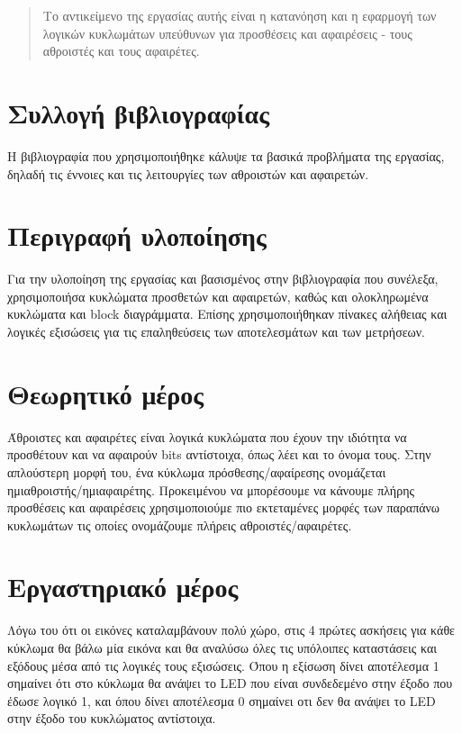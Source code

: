 \documentclass{article}
\begin{document}
\begin{titlepage}
\maketitle
\end{titlepage}

\renewcommand{\contentsname}{Περιεχόμενα}
\tableofcontents

\renewcommand{\abstractname}{Εισαγωγή}
\begin{abstract}
	Το αντικείμενο της εργασίας αυτής είναι η κατανόηση και η εφαρμογή
	των λογικών κυκλωμάτων υπεύθυνων για προσθέσεις και αφαιρέσεις - τους
	αθροιστές και τους αφαιρέτες.
\end{abstract}
\pagebreak

\section{Συλλογή βιβλιογραφίας}
Η βιβλιογραφία που χρησιμοποιήθηκε κάλυψε τα βασικά προβλήματα της εργασίας,
δηλαδή τις έννοιες και τις λειτουργίες των αθροιστών και αφαιρετών.

\section{Περιγραφή υλοποίησης}
Για την υλοποίηση της εργασίας και βασισμένος στην βιβλιογραφία που συνέλεξα,
χρησιμοποιήσα κυκλώματα προσθετών και αφαιρετών, καθώς και ολοκληρωμένα κυκλώματα και
block διαγράμματα.
Επίσης χρησιμοποιήθηκαν πίνακες αλήθειας και λογικές εξισώσεις για τις επαληθεύσεις
των αποτελεσμάτων και των μετρήσεων.

\section{Θεωρητικό μέρος}
Άθροιστες και αφαιρέτες είναι λογικά κυκλώματα που έχουν την ιδιότητα να προσθέτουν
και να αφαιρούν bits αντίστοιχα, όπως λέει και το όνομα τους. Στην απλούστερη μορφή του,
ένα κύκλωμα πρόσθεσης/αφαίρεσης ονομάζεται ημιαθροιστής/ημιαφαιρέτης. Προκειμένου να
μπορέσουμε να κάνουμε πλήρης προσθέσεις και αφαιρέσεις χρησιμοποιούμε πιο εκτεταμένες
μορφές των παραπάνω κυκλωμάτων τις οποίες ονομάζουμε πλήρεις αθροιστές/αφαιρέτες.

\section{Εργαστηριακό μέρος}

Λόγω του ότι οι εικόνες καταλαμβάνουν πολύ χώρο, στις 4 πρώτες ασκήσεις για κάθε
κύκλωμα θα βάλω μία εικόνα και θα αναλύσω όλες τις υπόλοιπες καταστάσεις και εξόδους
μέσα από τις λογικές τους εξισώσεις. Όπου η εξίσωση δίνει αποτέλεσμα 1 σημαίνει ότι
στο κύκλωμα θα ανάψει το LED που είναι συνδεδεμένο στην έξοδο που έδωσε λογικό 1, και
όπου δίνει αποτέλεσμα 0 σημαίνει οτι δεν θα ανάψει το LED στην έξοδο του κυκλώματος
αντίστοιχα.
\end{document}
